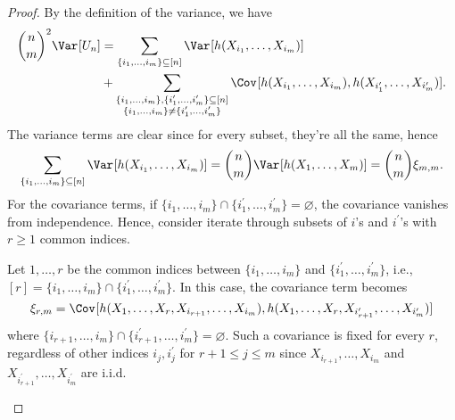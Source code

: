 \begin{proof}
	By the definition of the variance, we have
	\[
		\begin{split}
			\binom{n}{m}^2 \Var_{}[U_n]
			 & = \sum_{\{ i_1, \dots , i_m \} \subseteq [n]} \Var_{}[h(X_{i_1}, \dots , X_{i_m})]                 \\
			 & + \sum_{\substack{\{ i_1, \dots , i_m \} , \{ i_1^{\prime} , \dots , i_m^{\prime} \} \subseteq [n] \\ \{ i_1 , \dots , i_m \} \neq \{ i_1^{\prime} , \dots , i_m^{\prime} \}}} \Cov_{}[h(X_{i_1}, \dots , X_{i_m}), h(X_{i_1^{\prime} }, \dots , X_{i_m^{\prime} })].
		\end{split}
	\]
	The variance terms are clear since for every subset, they're all the same, hence
	\[
		\sum_{\{ i_1, \dots , i_m \} \subseteq [n]} \Var_{}[h(X_{i_1}, \dots , X_{i_m})]
		= \binom{n}{m} \Var_{}[h(X_1, \dots , X_m)]
		= \binom{n}{m} \xi_{m, m}.
	\]
	For the covariance terms, if \(\{ i_1, \dots , i_m \} \cap \{ i_1^{\prime} , \dots , i_m^{\prime}  \} = \varnothing \), the covariance vanishes from independence. Hence, consider iterate through subsets of \(i\)'s and \(i^{\prime} \)'s with \(r \geq 1\) common indices.

	\begin{intuition}
		Let \(1, \dots , r\) be the common indices between \(\{i_1, \dots , i_m \} \) and \(\{ i_1^{\prime} , \dots , i_m^{\prime} \} \), i.e., \([r] = \{i_1, \dots , i_m \} \cap \{ i_1^{\prime} , \dots , i_m^{\prime} \}\). In this case, the covariance term becomes
		\[
			\xi_{r, m}
			= \Cov_{}[h(X_1, \dots , X_r, X_{i_{r+1}}, \dots , X_{i_m}), h(X_1, \dots , X_r, X_{i_{r+1}^{\prime} }, \dots , X_{i_m^{\prime} })]
		\]
		where \(\{ i_{r+1} , \dots , i_m \} \cap \{ i_{r+1}^{\prime} , \dots , i_m^{\prime} \} = \varnothing \). Such a covariance is fixed for every \(r\), regardless of other indices \(i_j , i_j^{\prime} \) for \(r+1 \leq j \leq m\) since \(X_{i_{r+1}}, \dots , X_{i_m}\) and \(X_{i_{r+1}^{\prime} }, \dots , X_{i_m^{\prime} }\) are i.i.d.
	\end{intuition}


\end{proof}
